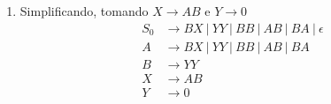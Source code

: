 \begin{enumerate}
    \item Simplificando, tomando $X \rightarrow AB$ e $Y \rightarrow 0$
    \begin{align*}
        S_0 &\rightarrow BX \ |\ YY \ |\ BB \ |\ AB \ |\ BA  \ |\ \epsilon \\
        A &\rightarrow BX \ |\ YY \ |\ BB \ |\ AB \ |\ BA \\
        B &\rightarrow YY \\
        X &\rightarrow AB \\
        Y &\rightarrow 0
    \end{align*}

\end{enumerate}